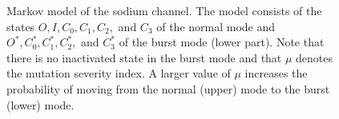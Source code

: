 \begin{figure}[ptb]
\begin{center}
\end{center}\caption{Markov model of the sodium channel. The model consists of the states
$O,I,C_{0},C_{1},C_{2},$ and $C_{3}$ of the normal mode and $O^{*},C^{*}
_{0},C^{*}_{1},C^{*}_{2},$ and $C^{*}_{3}$ of the burst mode (lower part). Note
that there is no inactivated state in the burst mode and that $\mu$ denotes
the mutation severity index. A larger value of $\mu$ increases the probability
of moving from the normal (upper) mode to the burst (lower) mode.}
\label{burst}
\end{figure}


